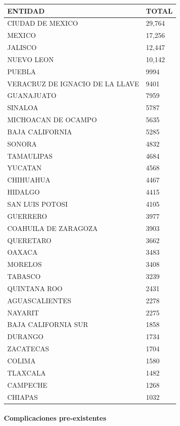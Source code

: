 \documentclass[11pt]{article}
\begin{document}
\begin{longtable}[]{@{}ll@{}}
\toprule\noalign{}
ENTIDAD & TOTAL \\
\midrule\noalign{}
\endhead
\bottomrule\noalign{}
\endlastfoot
CIUDAD DE MEXICO & 29,764 \\
MEXICO & 17,256 \\
JALISCO & 12,447 \\
NUEVO LEON & 10,142 \\
PUEBLA & 9994 \\
VERACRUZ DE IGNACIO DE LA LLAVE & 9401 \\
GUANAJUATO & 7959 \\
SINALOA & 5787 \\
MICHOACAN DE OCAMPO & 5635 \\
BAJA CALIFORNIA & 5285 \\
SONORA & 4832 \\
TAMAULIPAS & 4684 \\
YUCATAN & 4568 \\
CHIHUAHUA & 4467 \\
HIDALGO & 4415 \\
SAN LUIS POTOSI & 4105 \\
GUERRERO & 3977 \\
COAHUILA DE ZARAGOZA & 3903 \\
QUERETARO & 3662 \\
OAXACA & 3483 \\
MORELOS & 3408 \\
TABASCO & 3239 \\
QUINTANA ROO & 2431 \\
AGUASCALIENTES & 2278 \\
NAYARIT & 2275 \\
BAJA CALIFORNIA SUR & 1858 \\
DURANGO & 1734 \\
ZACATECAS & 1704 \\
COLIMA & 1580 \\
TLAXCALA & 1482 \\
CAMPECHE & 1268 \\
CHIAPAS & 1032 \\
\end{longtable}

\hypertarget{complicaciones-pre-existentes}{%
\paragraph{\texorpdfstring{\textbf{Complicaciones
pre-existentes}}{Complicaciones pre-existentes}}\label{complicaciones-pre-existentes}}
\end{document}
